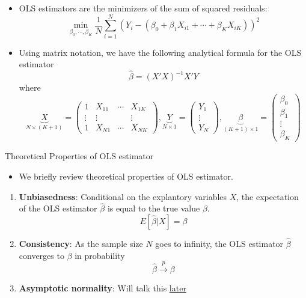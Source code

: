 \documentclass[
  ignorenonframetext,
]{beamer}
\providecommand{\tightlist}{%
  \setlength{\itemsep}{0pt}\setlength{\parskip}{0pt}}
\begin{document}
\begin{frame}

\begin{itemize}
\tightlist
\item
  OLS estimators are the minimizers of the sum of squared residuals: \[
   \min_{\beta_0, \cdots, \beta_K} \frac{1}{N} \sum_{i=1}^N (Y_i - (\beta_0 + \beta_1 X_{i1} + \cdots + \beta_K X_{iK}))^2
   \]
\item
  Using matrix notation, we have the following analytical formula for
  the OLS estimator \[
    \hat{\beta} = (X'X)^{-1} X'Y
    \] where \[
  \underbrace{X}_{N\times (K+1)}=\left(\begin{array}{cccc}
  1 & X_{11} & \cdots & X_{1K}\\
  \vdots & \vdots &  & \vdots\\
  1 & X_{N1} & \cdots & X_{NK}
  \end{array}\right),\underbrace{Y}_{N\times 1}=\left(\begin{array}{c}
  Y_{1}\\
  \vdots\\
  Y_{N}
  \end{array}\right),\underbrace{\beta}_{(K+1)\times 1}=\left(\begin{array}{c}
  \beta_{0}\\
  \beta_{1}\\
  \vdots\\
  \beta_{K}
  \end{array}\right)            
  \]
\end{itemize}

\end{frame}

\begin{frame}{Theoretical Properties of OLS estimator}
\protect\hypertarget{theoretical-properties-of-ols-estimator}{}

\begin{itemize}
\tightlist
\item
  We briefly review theoretical properties of OLS estimator.
\end{itemize}

\begin{enumerate}
\tightlist
\item
  \textbf{Unbiasedness}: Conditional on the explantory variables \(X\),
  the expectation of the OLS estimator \(\hat{\beta}\) is equal to the
  true value \(\beta\). \[
   E[\hat{\beta} | X] = \beta
   \]
\item
  \textbf{Consistency}: As the sample size \(N\) goes to infinity, the
  OLS estimator \(\hat{\beta}\) converges to \(\beta\) in probability \[
   \hat{\beta}\overset{p}{\longrightarrow}\beta
   \]
\item
  \textbf{Asymptotic normality}: Will talk this
  \protect\hyperlink{Statistical-Inference}{later}
\end{enumerate}

\end{frame}
\end{document}
